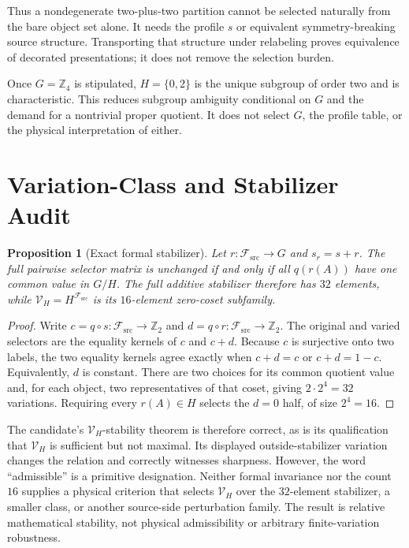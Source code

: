 \documentclass[11pt]{article}
\newtheorem{proposition}{Proposition}
\newcommand{\Vary}{\mathcal V_H}
\newcommand{\Fsrc}{\mathcal F_{\mathrm{src}}}
\begin{document}
Thus a nondegenerate two-plus-two partition cannot be selected naturally from
the bare object set alone.  It needs the profile \(s\) or equivalent
symmetry-breaking source structure.  Transporting that structure under
relabeling proves equivalence of decorated presentations; it does not remove
the selection burden.

Once \(G=\mathbb Z_4\) is stipulated, \(H=\{0,2\}\) is the unique subgroup of
order two and is characteristic.  This reduces subgroup ambiguity conditional
on \(G\) and the demand for a nontrivial proper quotient.  It does not select
\(G\), the profile table, or the physical interpretation of either.

\section{Variation-Class and Stabilizer Audit}

\begin{proposition}[Exact formal stabilizer]
Let \(r:\Fsrc\to G\) and \(s_r=s+r\).  The full pairwise selector matrix is
unchanged if and only if all \(q(r(A))\) have one common value in \(G/H\).
The full additive stabilizer therefore has \(32\) elements, while
\(\Vary=H^{\Fsrc}\) is its \(16\)-element zero-coset subfamily.
\end{proposition}

\begin{proof}
Write \(c=q\circ s:\Fsrc\to\mathbb Z_2\) and
\(d=q\circ r:\Fsrc\to\mathbb Z_2\).  The original and varied selectors are
the equality kernels of \(c\) and \(c+d\).  Because \(c\) is surjective onto
two labels, the two equality kernels agree exactly when \(c+d=c\) or
\(c+d=1-c\).  Equivalently, \(d\) is constant.  There are two choices for its
common quotient value and, for each object, two representatives of that
coset, giving \(2\cdot2^4=32\) variations.  Requiring every \(r(A)\in H\)
selects the \(d=0\) half, of size \(2^4=16\).
\end{proof}

The candidate's \(\Vary\)-stability theorem is therefore correct, as is its
qualification that \(\Vary\) is sufficient but not maximal.  Its displayed
outside-stabilizer variation changes the relation and correctly witnesses
sharpness.  However, the word ``admissible'' is a primitive designation.
Neither formal invariance nor the count \(16\) supplies a physical criterion
that selects \(\Vary\) over the \(32\)-element stabilizer, a smaller class, or
another source-side perturbation family.  The result is relative mathematical
stability, not physical admissibility or arbitrary finite-variation
robustness.
\end{document}
